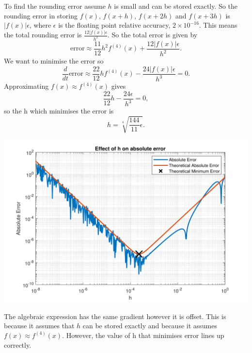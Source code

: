 \documentclass[a4paper,11pt]{article}
\begin{document}
\begin{enumerate}
\begin{enumerate}
		To find the rounding error assume $h$ is small and can be stored 
		exactly. So the rounding error in storing $f(x)$, $f(x+h)$, $f(x+2h)$ 
		and $f(x+3h)$ is $|f(x)|\epsilon$, where $\epsilon$ is the floating 
		point relative accuracy, $2\times 10^{-16}$. This means the total 
		rounding error is $\frac{12|f(x)|\epsilon}{h^{2}}$. So the total 
		error is given by
		\begin{equation}
			\text{error} \approx \frac{11}{12}h^{2}f^{(4)}(x) + 
			\frac{12|f(x)|\epsilon}{h^{2}}.
		\end{equation}
		We want to minimise the error so
		\begin{equation}
			\frac{d}{dt}\text{error} \approx \frac{22}{12}hf^{(4)}(x) - 
			\frac{24|f(x)|\epsilon}{h^{3}}=0.
		\end{equation}
		Approximating $f(x)\approx f^{(4)}(x)$ gives
		\begin{equation}
			\frac{22}{12}h - 
			\frac{24\epsilon}{h^{3}}=0,
		\end{equation}
		so the h which minimises the error is
		\begin{equation}
			h = \sqrt[4]{\frac{144}{11}\epsilon}.
		\end{equation}
		\begin{center}
			\includegraphics[scale=0.7]{images/Q2bii.pdf}
		\end{center}
		The algebraic expression has the same gradient however it is offset. 
		This is because it assumes that $h$ can be stored exactly and because 
		it assumes $f(x)\approx f^{(4)}(x)$. However, the value of h that 
		minimises error lines up correctly.
	\end{enumerate}
\end{enumerate}
\end{document}
